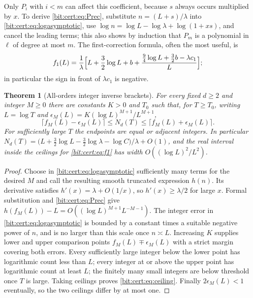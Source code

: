 \documentclass[11pt]{article}
\newtheorem{theorem}{Theorem}[section]
\theoremstyle{definition}\newtheorem{definition}[theorem]{Definition}
\theoremstyle{remark}\newtheorem{remark}[theorem]{Remark}
\begin{document}
Only $P_i$ with $i<m$ can affect this coefficient, because $s$ always occurs
multiplied by $x$. To derive \eqref{bit:cert:eq:Prec}, substitute
$n=(L+s)/\lambda$ into \eqref{bit:cert:eq:logasymptotic}, use
$\log n=\log L-\log\lambda+\log(1+xs)$, and cancel the leading terms; this also
shows by induction that $P_m$ is a polynomial in $\ell$ of degree at most $m$.
The first-correction formula, often the most useful, is
\begin{equation}\label{bit:cert:eq:f1}
 f_1(L)=\frac1\lambda\Bigl[
 L+\frac32\log L+b+
 \frac{\frac94\log L+\frac32 b-\lambda c_1}{L}\Bigr];
\end{equation}
in particular the sign in front of $\lambda c_1$ is negative.

\begin{theorem}[All-orders integer inverse brackets]\label{bit:cert:thm:inverse}
For every fixed $d\ge2$ and integer $M\ge0$ there are constants $K>0$ and $T_0$
such that, for $T\ge T_0$, writing $L=\log T$ and
$\epsilon_M(L)=K(\log L)^{M+1}/L^{M+1}$,
\begin{equation}\label{bit:cert:eq:ceiling}
 \bigl\lceil f_M(L)-\epsilon_M(L)\bigr\rceil\le N_d(T)
 \le\bigl\lceil f_M(L)+\epsilon_M(L)\bigr\rceil.
\end{equation}
For sufficiently large $T$ the endpoints are equal or adjacent integers. In
particular
$N_d(T)=\bigl(L+\frac32\log L-\frac32\log\lambda-\log C\bigr)/\lambda+O(1)$,
and the real interval inside the ceilings for \eqref{bit:cert:eq:f1} has width
$O((\log L)^2/L^2)$.
\end{theorem}
\begin{proof}
Choose in \eqref{bit:cert:eq:logasymptotic} sufficiently many terms for the
desired $M$ and call the resulting smooth truncated expression $h(n)$. Its
derivative satisfies $h'(x)=\lambda+O(1/x)$, so $h'(x)\ge\lambda/2$ for large
$x$. Formal substitution and \eqref{bit:cert:eq:Prec} give
$h(f_M(L))-L=O((\log L)^{M+1}L^{-M-1})$. The integer error in
\eqref{bit:cert:eq:logasymptotic} is bounded by a constant times a suitable
negative power of $n$, and is no larger than this scale once $n\asymp L$.
Increasing $K$ supplies lower and upper comparison points
$f_M(L)\mp\epsilon_M(L)$ with a strict margin covering both errors. Every
sufficiently large integer below the lower point has logarithmic count less
than $L$; every integer at or above the upper point has logarithmic count at
least $L$; the finitely many small integers are below threshold once $T$ is
large. Taking ceilings proves \eqref{bit:cert:eq:ceiling}. Finally
$2\epsilon_M(L)<1$ eventually, so the two ceilings differ by at most one.
\end{proof}
\end{document}
